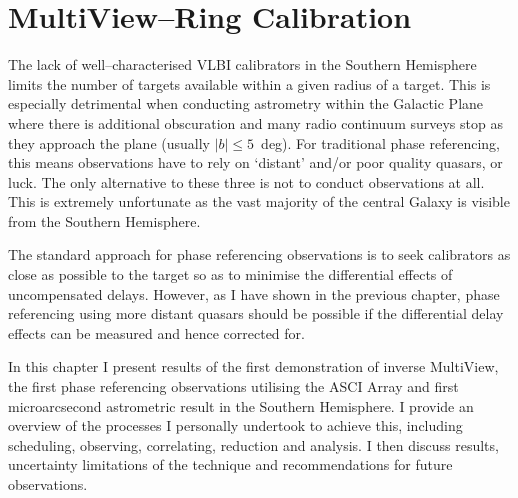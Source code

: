 

\chapter{MultiView--Ring Calibration}\label{chap:chapter6}
{	\onehalfspacing
	\vspace{4cm}	
	
	The lack of well--characterised VLBI calibrators in the Southern Hemisphere limits the number of targets available within a given radius of a target. This is especially detrimental when conducting astrometry within the Galactic Plane where there is additional obscuration and many radio continuum surveys stop as they approach the plane (usually $|b|\le5$~deg). For traditional phase referencing, this means observations have to rely on `distant' and/or poor quality quasars, or luck. The only alternative to these three is not to conduct observations at all. This is extremely unfortunate as the vast majority of the central Galaxy is visible from the Southern Hemisphere.
	
	The standard approach for phase referencing observations is to seek calibrators as close as possible to the target so as to minimise the differential effects of uncompensated delays. However, as I have shown in the previous chapter, phase referencing using more distant quasars should be possible if the differential delay effects can be measured and hence corrected for.
	
	In this chapter I present results of the first demonstration of inverse MultiView, the first phase referencing observations utilising the ASCI Array and first microarcsecond astrometric result in the Southern Hemisphere. I provide an overview of the processes I personally undertook to achieve this, including scheduling, observing, correlating, reduction and analysis. I then discuss results, uncertainty limitations of the technique and recommendations for future observations.

}
	\singlespacing

\newpage
